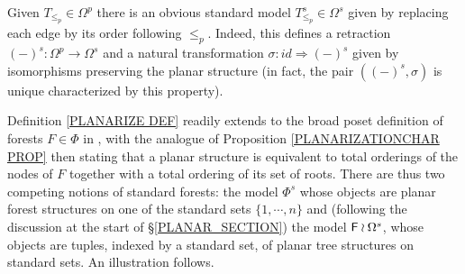 \documentclass[a4paper,10pt]{article}%
\begin{document}
Given $T_{\leq_p} \in \Omega^p$ there is an obvious standard model $T_{\leq_p}^s \in \Omega^s$ given by replacing each edge by its order following $\leq_p$. Indeed, this defines a retraction 
$(\minus)^s \colon \Omega^p \to \Omega^s$
and a natural transformation 
$\sigma \colon id \Rightarrow (\minus)^s$
given by isomorphisms preserving the planar structure
(in fact, the pair $\left((\minus)^s, \sigma \right)$ is  unique characterized by this property).


\begin{remark}\label{FORESTPLAN REM}
	Definition \ref{PLANARIZE DEF} readily extends to 
	the broad poset definition of forests $F \in \Phi$ 
	in \cite[Def. 5.27]{Pe17}, with the analogue of
	Proposition \ref{PLANARIZATIONCHAR PROP}
	then stating that a planar structure is 
equivalent to total orderings of the nodes of $F$ together with a total ordering of its set of roots.
There are thus two competing notions of standard forests: the \cite[Def. 5.27]{Pe17} model $\Phi^s$ whose objects are planar forest structures on one of the standard sets $\{1,\cdots,n\}$ and (following the discussion at the start of \S \ref{PLANAR_SECTION})
the model $\mathsf{F} \wr \Omega^s$, whose objects are tuples, indexed by a standard set, of planar tree structures on standard sets.
An illustration follows.



\end{remark}
\end{document}
